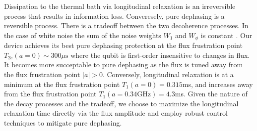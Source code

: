 \documentclass[
  amsfonts,
  amsmath,
  tbtags,
  amssymb,
  aps,
  nobibnotes,
  twocolumn,
  superscriptaddress,
]{revtex4-2}
\begin{document}
Dissipation to the thermal bath via longitudinal
relaxation is an irreversible process
that results in information loss.
Converesely, pure dephasing is a reversible process.
There is a tradeoff between the two decoherence processes. In the case of white
noise the sum of the noise weights $W_{1}$ and $W_{\phi}$
is constant \cite{huang2020engineering}.
Our device achieves its best pure dephasing
protection at the flux frustration point
$T_{2e}(a = 0) \sim 300 \mu\textrm{s}$
where the qubit is first-order insensitive to changes in flux.
It becomes more succeptable to pure dephasing as the flux is tuned away from the flux
frustration point $|a| > 0$. Conversely, longitudinal relaxation is at a minimum
at the flux frustration point $T_{1}(a = 0) = 0.315$ms,
and increases away from the flux frustration point
$T_{1}(a = 0.34 \textrm{GHz}) = 4.3$ms. Given the nature
of the decay processes and the tradeoff, we choose
to maximize the longitudinal relaxation time directly
via the flux amplitude and employ robust control techniques to mitigate
pure dephasing.

\end{document}
